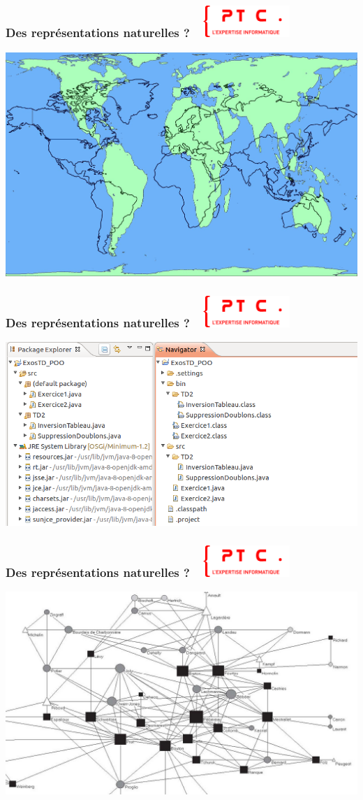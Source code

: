 \documentclass[11pt]{beamer}
\newenvironment{slide}[1]{%
\begin{frame}[environment=slide]
\frametitle{#1~\hfill~\includegraphics[height=1.2cm]{./epitech.png}}
}{%
\end{frame}
}
\begin{document}
\begin{slide}{Des représentations naturelles ?}
\begin{center}

\includegraphics[scale=0.15]{projections}

\end{center}
\end{slide}

\begin{slide}{Des représentations naturelles ?}

\includegraphics[scale=0.35]{files}

\end{slide}

\begin{slide}{Des représentations naturelles ?}

\includegraphics[scale=0.6]{dudouet}

\end{slide}
\end{document}
